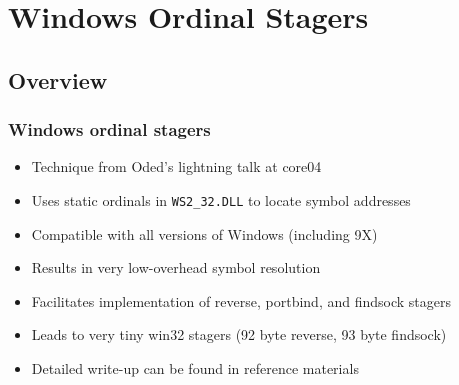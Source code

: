 \documentclass{beamer}
\newenvironment{sitemize}{\vspace{1mm}\begin{itemize}\itemsep 4pt\small}{\end{itemize}}
\begin{document}
\section{Windows Ordinal Stagers}

\subsection{Overview}
\begin{frame}[t]
    \frametitle{Windows ordinal stagers}

    \begin{sitemize}
        \item Technique from Oded's lightning talk at core04
        \item Uses static ordinals in \texttt{WS2\_32.DLL} to locate symbol
        addresses
        \item Compatible with all versions of Windows (including 9X)
        \item Results in very low-overhead symbol resolution
        \item Facilitates implementation of reverse, portbind, and
        findsock stagers
        \item Leads to very tiny win32 stagers (92 byte reverse, 93
        byte findsock)
        \item Detailed write-up can be found in reference materials
    \end{sitemize}
\end{frame}
\end{document}
